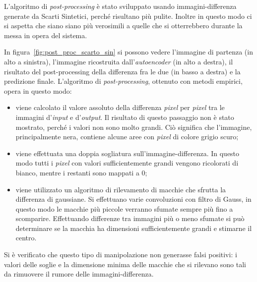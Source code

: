 L'algoritmo di \textit{post-processing} è stato sviluppato usando immagini-differenza generate da Scarti Sintetici, perché risultano più pulite.
Inoltre in questo modo ci si aspetta che siano siano più verosimili a quelle che si otterrebbero durante la messa in opera del sistema.

In figura~\ref{fig:post_proc_scarto_sin} si possono vedere l'immagine di partenza (in alto a sinistra), l'immagine ricostruita dall'\textit{autoencoder} (in alto a destra), il risultato del post-processing della differenza fra le due (in basso a destra) e la predizione finale.
L'algoritmo di \textit{post-processing}, ottenuto con metodi empirici, opera in questo modo:
\begin{itemize}
  \item viene calcolato il valore assoluto della differenza \textit{pixel} per \textit{pixel} tra le immagini d'\textit{input} e d'\textit{output}.
    Il risultato di questo passaggio non è stato mostrato, perché i valori non sono molto grandi.
    Ciò significa che l'immagine, principalmente nera, contiene alcune aree con \textit{pixel} di colore grigio scuro;

  \item viene effettuata una doppia sogliatura sull'immagine-differenza.
    In questo modo tutti i \textit{pixel} con valori sufficientemente grandi vengono ricolorati di bianco, mentre i restanti sono mappati a $0$;


  \item viene utilizzato un algoritmo di rilevamento di macchie che sfrutta la differenza di gaussiane.
    Si effettuano varie convoluzioni con filtro di Gauss, in questo modo le macchie più piccole verranno sfumate sempre più fino a scomparire.
    Effettuando differenze tra immagini più o meno sfumate si può determinare se la macchia ha dimensioni sufficientemente grandi e stimarne il centro.

\end{itemize}

Si è verificato che questo tipo di manipolazione non generasse falsi positivi: i valori delle soglie e la dimensione minima delle macchie che si rilevano sono tali da rimuovere il rumore delle immagini-differenza.

